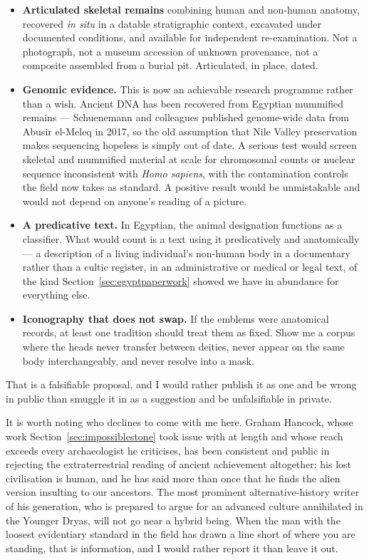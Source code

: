 \begin{itemize}
  \item \textbf{Articulated skeletal remains} combining human and non-human anatomy, recovered
  \emph{in situ} in a datable stratigraphic context, excavated under documented conditions, and
  available for independent re-examination. Not a photograph, not a museum accession of unknown
  provenance, not a composite assembled from a burial pit. Articulated, in place, dated.
  \item \textbf{Genomic evidence.} This is now an achievable research programme rather than a wish.
  Ancient DNA has been recovered from Egyptian mummified remains --- Schuenemann and colleagues
  published genome-wide data from Abusir el-Meleq in 2017, so the old assumption that Nile Valley
  preservation makes sequencing hopeless is simply out of date. A serious test would screen skeletal
  and mummified material at scale for chromosomal counts or nuclear sequence inconsistent with
  \emph{Homo sapiens}, with the contamination controls the field now takes as standard. A positive
  result would be unmistakable and would not depend on anyone's reading of a picture.
  \item \textbf{A predicative text.} In Egyptian, the animal designation functions as a classifier.
  What would count is a text using it predicatively and anatomically --- a description of a living
  individual's non-human body in a documentary rather than a cultic register, in an administrative
  or medical or legal text, of the kind Section~\ref{sec:egyptpaperwork} showed we have in abundance
  for everything else.
  \item \textbf{Iconography that does not swap.} If the emblems were anatomical records, at least
  one tradition should treat them as fixed. Show me a corpus where the heads never transfer between
  deities, never appear on the same body interchangeably, and never resolve into a mask.
\end{itemize}

That is a falsifiable proposal, and I would rather publish it as one and be wrong in public than
smuggle it in as a suggestion and be unfalsifiable in private.

It is worth noting who declines to come with me here. Graham Hancock, whose work
Section~\ref{sec:impossiblestone} took issue with at length and whose reach exceeds every
archaeologist he criticises, has been consistent and public in rejecting the extraterrestrial
reading of ancient achievement altogether: his lost civilisation is human, and he has said more than
once that he finds the alien version insulting to our ancestors. The most prominent
alternative-history writer of his generation, who is prepared to argue for an advanced culture
annihilated in the Younger Dryas, will not go near a hybrid being. When the man with the loosest
evidentiary standard in the field has drawn a line short of where you are standing, that is
information, and I would rather report it than leave it out.

